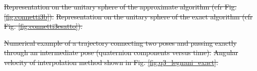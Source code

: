 \documentclass[preprint, 12pt]{elsarticle}
\providecommand{\DIFdel}[1]{{\protect\color{red}\sout{#1}}}                      %
\providecommand{\DIFdelFL}[1]{\DIFdel{#1}} %
\begin{document}
{%
\DIFdelFL{Representation on the unitary sphere of the approximate algorithm (cfr Fig. \ref{fig:connetti3b}).}}
{%
\DIFdelFL{Representation on the unitary sphere of the exact algorithm (cfr Fig. \ref{fig:connetti3esatto}).}}

{%
\DIFdelFL{Numerical example of a trajectory connecting two poses and passing exactly through an intermediate pose (quaternion components versus time).}}
{%
\DIFdelFL{Angular velocity of interpolation method shown in Fig. \ref{fig:q3_legnani_exact}.}}
\end{document}
